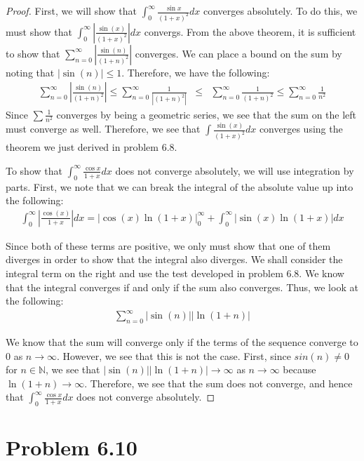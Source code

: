 \documentclass[psamsfonts]{amsart}
\theoremstyle{definition}
\theoremstyle{remark}
\numberwithin{equation}{section}
\begin{document}
\begin{proof}
First, we will show that $\int_0^\infty \frac{\sin{x}}{(1+x)^2} dx$ converges absolutely. To do this, we must show that $\int_0^\infty \left| \frac{\sin(x)}{(1+x)^2} \right| dx$ convergs. From the above theorem, it is sufficient to show that $\sum_{n=0}^\infty |\frac{\sin(n)}{(1+n)^2}|$ converges. We can place a bound on the sum by noting that $|\sin(n)| \leq 1$. Therefore, we have the following:
\begin{eqnarray}
\sum_{n=0}^\infty \left| \frac{\sin(n)}{(1+n)^2} \right| \leq \sum_{n=0}^\infty \frac{1}{|(1+n)^2|} &\leq& \sum_{n=0}^\infty \frac{1}{(1+n)^2} \leq \sum_{n=0}^\infty \frac{1}{n^2}
\end{eqnarray}
Since $\sum \frac{1}{n^2}$ converges by being a geometric series, we see that the sum on the left must converge as well. Therefore, we see that $\int \frac{\sin(x)}{(1+x)^2} dx$ converges using the theorem we just derived in problem 6.8. 

To show that $\int_0^\infty \frac{\cos x}{1+x} dx$ does not converge absolutely, we will use integration by parts. First, we note that we can break the integral of the absolute value up into the following:
\begin{eqnarray}
\int_0^\infty \left| \frac{\cos (x)}{1+x} \right| dx = \left| \cos(x) \ln(1+x) \right|_0^\infty + \int_0^\infty |\sin(x) \ln (1+x) | dx
\end{eqnarray}

Since both of these terms are positive, we only must show that one of them diverges in order to show that the integral also diverges. We shall consider the integral term on the right and use the test developed in problem 6.8. We know that the integral converges if and only if the sum also converges. Thus, we look at the following:
\begin{eqnarray}
\sum_{n=0}^\infty |\sin(n)| |\ln(1+n)| 
\end{eqnarray}

We know that the sum will converge only if the terms of the sequence converge to $0$ as $n \to \infty$. However, we see that this is not the case. First, since $sin(n) \neq 0$ for $n \in \mathbb{N}$, we see that $|\sin(n)| |\ln(1+n)| \to \infty$ as $n \to \infty$ because $\ln(1+n) \to \infty$. Therefore, we see that the sum does not converge, and hence that $\int_0^\infty \frac{\cos x}{1+x} dx$ does not converge absolutely.  
\end{proof}

\section{Problem 6.10}
\end{document}
